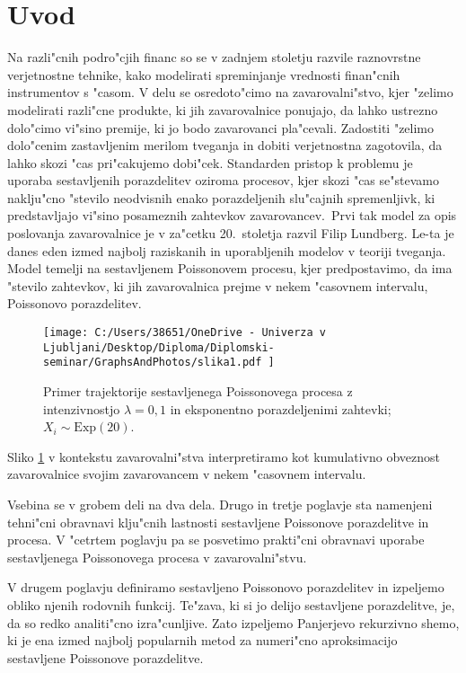\documentclass[12pt, a4paper, reqno]{amsart}
\theoremstyle{definition}
\theoremstyle{plain}
\newcommand{\1}{\mathds{1}}
\begin{document}
\section{Uvod}
    Na razli"cnih podro"cjih financ so se v zadnjem stoletju razvile raznovrstne verjetnostne tehnike, kako 
    modelirati spreminjanje vrednosti finan"cnih instrumentov s "casom. V delu se osredoto"cimo na zavarovalni"stvo, 
    kjer "zelimo modelirati razli"cne produkte, ki jih zavarovalnice ponujajo, da lahko ustrezno dolo"cimo vi"sino premije, ki jo
    bodo zavarovanci pla"cevali. Zadostiti "zelimo dolo"cenim zastavljenim merilom tveganja in dobiti verjetnostna zagotovila, 
    da lahko skozi "cas pri"cakujemo dobi"cek. 
    Standarden pristop k problemu je uporaba sestavljenih porazdelitev oziroma procesov, kjer skozi "cas se"stevamo naklju"cno "stevilo 
    neodvisnih enako porazdeljenih slu"cajnih spremenljivk, ki predstavljajo vi"sino posameznih zahtevkov zavarovancev.\ Prvi tak model za opis
    poslovanja zavarovalnice 
    je v za"cetku 20.\ stoletja razvil Filip Lundberg. Le-ta je danes eden izmed najbolj raziskanih in 
    uporabljenih modelov v teoriji tveganja. Model temelji na sestavljenem Poissonovem procesu, kjer predpostavimo, da ima "stevilo zahtevkov,
    ki jih zavarovalnica prejme v nekem "casovnem intervalu, Poissonovo porazdelitev.

    \begin{figure}[H]
        \centering
        \texttt{[image: 
            C:/Users/38651/OneDrive - Univerza v Ljubljani/Desktop/Diploma/Diplomski-seminar/GraphsAndPhotos/slika1.pdf
            ]}
        \caption{Primer trajektorije sestavljenega Poissonovega procesa z intenzivnostjo $\lambda = 0{,}1$ in
        eksponentno porazdeljenimi zahtevki; $X_i\sim\text{Exp}(20)$.}
        \label{fig:slika1}
    \end{figure}
    \noindent
    Sliko \ref{fig:slika1} v kontekstu zavarovalni"stva interpretiramo kot kumulativno obveznost zavarovalnice 
    svojim zavarovancem v nekem "casovnem intervalu. 

    Vsebina se v grobem deli na dva dela. Drugo in tretje poglavje sta namenjeni tehni"cni obravnavi klju"cnih lastnosti 
    sestavljene Poissonove porazdelitve in procesa. V "cetrtem poglavju pa se posvetimo prakti"cni obravnavi uporabe sestavljenega
    Poissonovega procesa v zavarovalni"stvu. 

    V drugem poglavju definiramo sestavljeno Poissonovo porazdelitev in izpeljemo obliko njenih rodovnih funkcij.
    Te"zava, ki si jo delijo sestavljene porazdelitve, je, da so redko analiti"cno izra"cunljive. 
    Zato izpeljemo Panjerjevo rekurzivno shemo, ki 
    je ena izmed najbolj popularnih metod za numeri"cno aproksimacijo sestavljene Poissonove porazdelitve.
\end{document}
